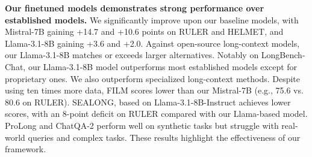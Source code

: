 \textbf{Our finetuned models demonstrates strong performance over established models.} 
We significantly improve upon our baseline models, with Mistral-7B gaining +14.7 and +10.6 points on RULER and HELMET, and Llama-3.1-8B gaining +3.6 and +2.0.
Against open-source long-context models, our Llama-3.1-8B matches or exceeds larger alternatives. 
Notably on LongBench-Chat, our Llama-3.1-8B model outperforms most established models except for proprietary ones.
We also outperform specialized long-context methods. Despite using ten times more data, FILM scores lower than our Mistral-7B (e.g., 75.6 vs. 80.6 on RULER). SEALONG, based on Llama-3.1-8B-Instruct achieves lower scores, with an 8-point deficit on RULER compared with our Llama-based model. ProLong and ChatQA-2 perform well on synthetic tasks but struggle with real-world queries and complex tasks. 
These results highlight the effectiveness of our framework.


